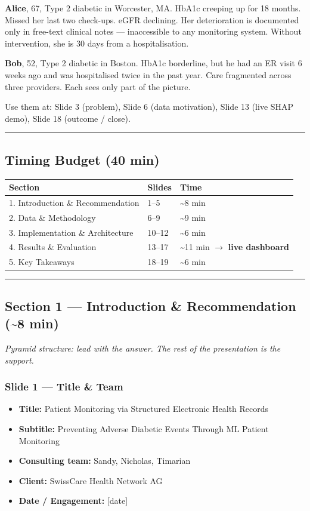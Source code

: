 \documentclass[11pt,a4paper]{article}
\begin{document}
\textbf{Alice}, 67, Type 2 diabetic in Worcester, MA. HbA1c creeping up for 18 months. Missed her last two check-ups. eGFR declining. Her deterioration is documented only in free-text clinical notes --- inaccessible to any monitoring system. Without intervention, she is 30 days from a hospitalisation.

\textbf{Bob}, 52, Type 2 diabetic in Boston. HbA1c borderline, but he had an ER visit 6 weeks ago and was hospitalised twice in the past year. Care fragmented across three providers. Each sees only part of the picture.

Use them at: Slide 3 (problem), Slide 6 (data motivation), Slide 13 (live SHAP demo), Slide 18 (outcome / close).

\noindent\rule{\linewidth}{0.4pt}

\subsection{Timing Budget (40 min)}

\begin{center}
\begin{tabular}{lll}
\toprule
Section & Slides & Time \\
\midrule
1. Introduction \& Recommendation & 1--5 & \textasciitilde{}8 min \\
2. Data \& Methodology & 6--9 & \textasciitilde{}9 min \\
3. Implementation \& Architecture & 10--12 & \textasciitilde{}6 min \\
4. Results \& Evaluation & 13--17 & \textasciitilde{}11 min $\rightarrow$ \textbf{live dashboard} \\
5. Key Takeaways & 18--19 & \textasciitilde{}6 min \\
\bottomrule
\end{tabular}
\end{center}

\noindent\rule{\linewidth}{0.4pt}

\subsection{Section 1 --- Introduction \& Recommendation (\textasciitilde{}8 min)}
\emph{Pyramid structure: lead with the answer. The rest of the presentation is the support.}

\subsubsection{Slide 1 --- Title \& Team}
\begin{itemize}
\item \textbf{Title:} Patient Monitoring via Structured Electronic Health Records
\item \textbf{Subtitle:} Preventing Adverse Diabetic Events Through ML Patient Monitoring
\item \textbf{Consulting team:} Sandy, Nicholas, Timarian
\item \textbf{Client:} SwissCare Health Network AG
\item \textbf{Date / Engagement:} [date]
\end{itemize}
\end{document}
